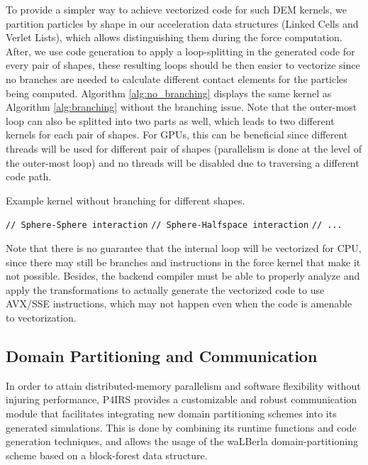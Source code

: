 \documentclass[preprint,12pt]{elsarticle}
\begin{document}
To provide a simpler way to achieve vectorized code for such DEM kernels, we partition particles by shape in our acceleration data structures (Linked Cells and Verlet Lists), which allows distinguishing them during the force computation.
After, we use code generation to apply a loop-splitting in the generated code for every pair of shapes, these resulting loops should be then easier to vectorize since no branches are needed to calculate different contact elements for the particles being computed.
Algorithm \autoref{alg:no_branching} displays the same kernel as Algorithm \autoref{alg:branching} without the branching issue.
Note that the outer-most loop can also be splitted into two parts as well, which leads to two different kernels for each pair of shapes.
For GPUs, this can be beneficial since different threads will be used for different pair of shapes (parallelism is done at the level of the outer-most loop) and no threads will be disabled due to traversing a different code path.

\begin{algorithm}[H]
  \caption{Example kernel without branching for different shapes.}
  \label{alg:no_branching}
  \begin{algorithmic}[1]
        \State \texttt{// Sphere-Sphere interaction}
      \EndFor
        \State \texttt{// Sphere-Halfspace interaction}
      \EndFor
      \State \texttt{// ...}
    \EndFor
  \end{algorithmic}
\end{algorithm}

Note that there is no guarantee that the internal loop will be vectorized for CPU, since there may still be branches and instructions in the force kernel that make it not possible.
Besides, the backend compiler must be able to properly analyze and apply the transformations to actually generate the vectorized code to use AVX/SSE instructions, which may not happen even when the code is amenable to vectorization.

\subsection{Domain Partitioning and Communication}
\label{sec:domain_partitioning}

In order to attain distributed-memory parallelism and software flexibility without injuring performance, P4IRS provides a customizable and robust communication module that facilitates integrating new domain partitioning schemes into its generated simulations.
This is done by combining its runtime functions and code generation techniques, and allows the usage of the waLBerla domain-partitioning scheme based on a block-forest data structure.
\end{document}
